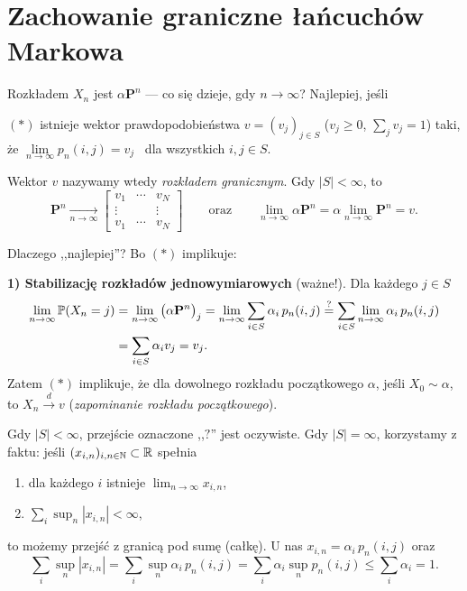 \documentclass[dvipsnames]{book}
\begin{document}
\section*{Zachowanie graniczne łańcuchów Markowa}

Rozkładem $X_n$ jest $\alpha \mathbf{P}^n$ --- co się dzieje, gdy
$n \to \infty$? Najlepiej, jeśli

\begin{center}
$(*)$ \quad istnieje wektor prawdopodobieństwa $v = (v_j)_{j \in S}$
($v_j \geq 0$, $\sum_j v_j = 1$) taki, że
$\lim\limits_{n \to \infty} p_n(i,j) = v_j$ \ dla wszystkich $i,j \in S$.
\end{center}

\begin{definicja}
Wektor $v$ nazywamy wtedy \emph{rozkładem granicznym}. Gdy $|S| < \infty$,
to
\[
  \mathbf{P}^n \xrightarrow[n \to \infty]{}
  \begin{bmatrix}
    v_1 & \cdots & v_N \\
    \vdots & & \vdots \\
    v_1 & \cdots & v_N
  \end{bmatrix}
  \qquad\text{oraz}\qquad
  \lim_{n \to \infty} \alpha \mathbf{P}^n
  = \alpha \lim_{n \to \infty} \mathbf{P}^n = v.
\]
\end{definicja}

Dlaczego ,,najlepiej''? Bo $(*)$ implikuje:

\textbf{1) Stabilizację rozkładów jednowymiarowych} (ważne!). Dla każdego
$j \in S$
\begin{align*}
  \lim_{n \to \infty} \P(X_n = j)
  &= \lim_{n \to \infty} \big(\alpha \mathbf{P}^n\big)_j
   = \lim_{n \to \infty} \sum_{i \in S} \alpha_i\, p_n(i,j)
   \overset{?}{=} \sum_{i \in S} \lim_{n \to \infty} \alpha_i\, p_n(i,j) \\
  &= \sum_{i \in S} \alpha_i v_j = v_j.
\end{align*}
Zatem $(*)$ implikuje, że dla dowolnego rozkładu początkowego $\alpha$, jeśli
$X_0 \sim \alpha$, to $X_n \xrightarrow{d} v$ (\emph{zapominanie rozkładu
początkowego}).

\begin{uwaga}
Gdy $|S| < \infty$, przejście oznaczone ,,$?$'' jest oczywiste. Gdy
$|S| = \infty$, korzystamy z faktu: jeśli
$(x_{i,n})_{i,n \in \N} \subset \R$ spełnia
\begin{enumerate}[label=\arabic*),topsep=0pt,itemsep=0pt]
  \item dla każdego $i$ istnieje $\lim_{n \to \infty} x_{i,n}$,
  \item $\sum_i \sup_n |x_{i,n}| < \infty$,
\end{enumerate}
to możemy przejść z granicą pod sumę (całkę). U nas
$x_{i,n} = \alpha_i\, p_n(i,j)$ oraz
\[
  \sum_i \sup_n |x_{i,n}|
  = \sum_i \sup_n \alpha_i\, p_n(i,j)
  = \sum_i \alpha_i \sup_n p_n(i,j)
  \leq \sum_i \alpha_i = 1.
\]
\end{uwaga}
\end{document}
